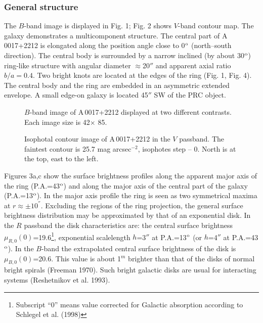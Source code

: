 \documentclass[]{aa}
\begin{document}
\subsubsection{General structure}

The $B$-band image is displayed in Fig. 1; Fig. 2 shows $V$-band
contour map. The galaxy demonstrates a multicomponent structure. 
The central part of A\,0017+2212 is elongated along the position
angle close to 0$^{\rm o}$ (north--south direction). The central
body is surrounded by a narrow inclined (by about 30$^{\rm o}$)
ring-like structure with angular diameter $\approx$20$''$ and
apparent axial ratio $b/a=0.4$. Two bright knots are located
at the edges of the ring (Fig. 1, Fig. 4). The central body and the
ring are embedded in an asymmetric extended envelope. A small edge-on
galaxy is located 45$''$ SW of the PRC object.

\begin{figure}
\centerline{}
\caption{$B$-band image of A\,0017+2212 displayed at two different
contrasts. Each image size is 42\arcsec $\times$ 85\arcsec.
}
\end{figure}

\begin{figure}
\centerline{}
\caption{Isophotal contour image of A\,0017+2212 in the $V$ passband.
The faintest contour is 25.7 mag arcsec$^{-2}$, isophotes step --
0. North is at the top, east to the left.
}
\end{figure}

Figures 3a,c show the surface brightness profiles  
along the apparent major axis of the ring (P.A.=43$^{\rm o}$) and
along the major axis of the central part of the galaxy
(P.A.=13$^{\rm o}$).
In the major axis profile the ring is seen as two symmetrical
maxima at $r \approx \pm 10^{''}$. Excluding the regions of the
ring projection, the general surface brightness distribution 
may be approximated by that of an exponential disk. In the $R$
passband the disk characteristics are: the central surface 
brightness $\mu_{R,0}(0)$=19.6\footnote{Subscript ``0'' means
value corrected for Galactic absorption according to 
Schlegel et al. (1998)}, exponential scalelength
$h$=3$''$ at P.A.=13$^{\rm o}$
(or $h$=4$''$ at P.A.=43$^{\rm o}$). In the $B$-band the extrapolated
central surface brightness of the disk is $\mu_{B,0}(0)$=20.6.
This value is about 1$^m$ brighter than that of the disks of
normal bright spirals (Freeman 1970). Such bright galactic disks 
are usual for interacting systems (Reshetnikov et al. 1993).
\end{document}
